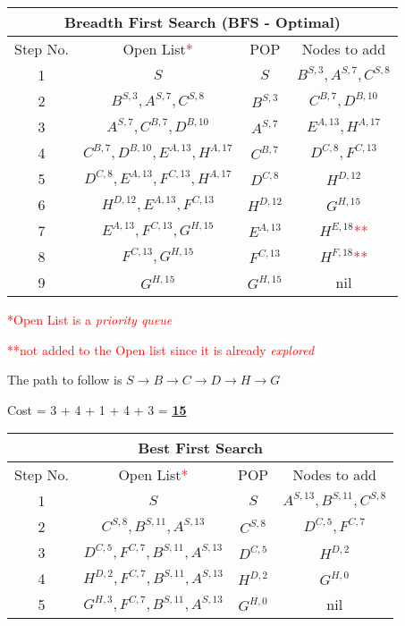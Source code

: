 \documentclass[12pt, letterpaper]{article}
\begin{document}
\begin{center}
    \begin{tabular}{|c|c|c|c|}
    \hline
    \multicolumn{4}{|c|}{Breadth First Search (\textbf{BFS} - Optimal)}\\
    \hline
    Step No. & Open List\textcolor{red}{*} & POP & Nodes to add \\ 
    \hline
    1 & $S$ & $S$ & $B^{S,3}, A^{S,7}, C^{S,8}$\\
    \hline
    2 & $B^{S,3}, A^{S,7}, C^{S,8}$ & $B^{S,3}$ & $C^{B,7},D^{B,10}$ \\
    \hline
    3 & $A^{S,7}, C^{B,7}, D^{B,10}$ & $A^{S,7}$ & $E^{A,13}, H^{A,17}$ \\
    \hline
    4 & $C^{B,7}, D^{B,10}, E^{A,13}, H^{A,17}$ & $C^{B,7}$ & $D^{C,8}, F^{C,13}$\\
    \hline
    5 & $D^{C,8}, E^{A,13}, F^{C,13}, H^{A,17}$ & $D^{C,8}$ & $H^{D,12}$\\
    \hline
    6 & $H^{D,12}, E^{A,13}, F^{C,13}$ & $H^{D,12}$ & $G^{H,15}$\\
    \hline
    7 & $E^{A,13}, F^{C,13}, G^{H,15}$ & $E^{A,13}$ & $H^{E,18}$\textcolor{red}{**}\\
    \hline
    8 & $F^{C,13}, G^{H,15}$ & $F^{C,13}$ & $H^{F,18}$\textcolor{red}{**}\\
    \hline
    9 & $G^{H,15}$ & $G^{H,15}$ & nil\\
    \hline
    \end{tabular}
\end{center}

\textcolor{red}{*Open List is a \textit{priority queue}}

\textcolor{red}{**not added to the Open list since it is already \textit{explored}}

The path to follow is $S\rightarrow B\rightarrow C\rightarrow D\rightarrow H\rightarrow G$

Cost = 3 + 4 + 1 + 4 + 3 = \underline{\textbf{15}}

\begin{center}
    \begin{tabular}{|c|c|c|c|}
    \hline
    \multicolumn{4}{|c|}{Best First Search}\\
    \hline
    Step No. & Open List\textcolor{red}{*} & POP & Nodes to add \\ 
    \hline
    1 & $S$ & $S$ & $A^{S,13}, B^{S,11}, C^{S,8}$ \\
    \hline
    2 & $C^{S,8}, B^{S,11}, A^{S,13}$ & $C^{S,8}$ & $D^{C,5}, F^{C,7}$ \\
    \hline
    3 & $D^{C,5}, F^{C,7}, B^{S,11}, A^{S,13}$ & $D^{C,5}$ & $H^{D,2}$ \\
    \hline
    4 & $H^{D,2}, F^{C,7}, B^{S,11}, A^{S,13}$ & $H^{D,2}$ & $G^{H,0}$\\
    \hline
    5 & $G^{H,3}, F^{C,7}, B^{S,11}, A^{S,13}$ & $G^{H,0}$ & nil\\
    \hline
    \end{tabular}
\end{center}
\end{document}
